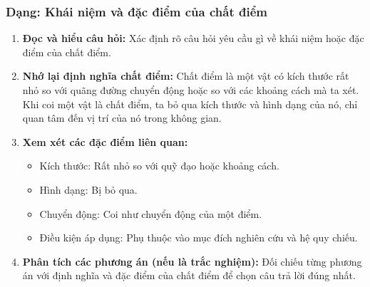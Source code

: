 \subsubsection{Dạng: Khái niệm và đặc điểm của chất điểm}
\begin{phuongphap}
\begin{enumerate}
    \item \textbf{Đọc và hiểu câu hỏi:} Xác định rõ câu hỏi yêu cầu gì về khái niệm hoặc đặc điểm của chất điểm.
    \item \textbf{Nhớ lại định nghĩa chất điểm:} Chất điểm là một vật có kích thước rất nhỏ so với quãng đường chuyển động hoặc so với các khoảng cách mà ta xét. Khi coi một vật là chất điểm, ta bỏ qua kích thước và hình dạng của nó, chỉ quan tâm đến vị trí của nó trong không gian.
    \item \textbf{Xem xét các đặc điểm liên quan:}
    \begin{itemize}
        \item Kích thước: Rất nhỏ so với quỹ đạo hoặc khoảng cách.
        \item Hình dạng: Bị bỏ qua.
        \item Chuyển động: Coi như chuyển động của một điểm.
        \item Điều kiện áp dụng: Phụ thuộc vào mục đích nghiên cứu và hệ quy chiếu.
    \end{itemize}
    \item \textbf{Phân tích các phương án (nếu là trắc nghiệm):} Đối chiếu từng phương án với định nghĩa và đặc điểm của chất điểm để chọn câu trả lời đúng nhất.
\end{enumerate}
\end{phuongphap}
